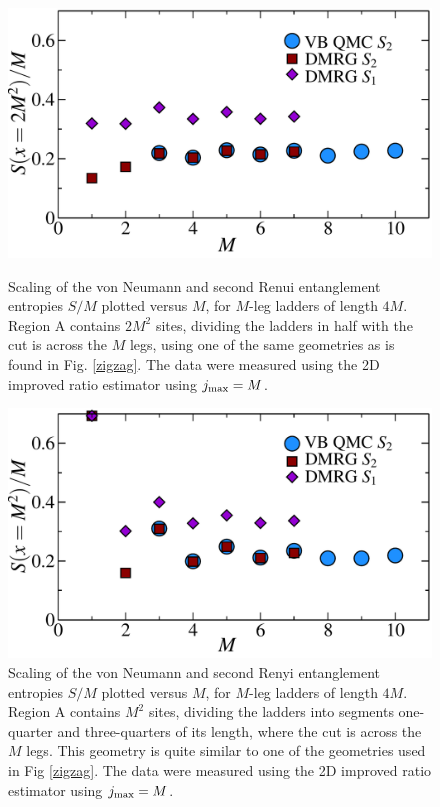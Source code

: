 \begin{figure} {
	\vspace{-1cm}
	\hspace{1cm}
	\includegraphics[width=5in]{./figures/made/awesomeplot/marea2.pdf} 
	\caption[Entanglement entropy $S/M$ vs. $M$ for $M$-leg ladders of length $4M$ cut in half]{ 
Scaling of the von Neumann and second Renui entanglement entropies $S/M$ plotted versus $M$, for $M$-leg ladders of length $4M$.  
Region A contains $2M^2$ sites, dividing the ladders in half with the cut is across the $M$ legs, using one of the same geometries as is found in Fig. \ref{zigzag}.
The data were measured using the 2D improved ratio estimator using $j_{\rm max} = M$.
	\label{2Dbetter1}
	}
\vspace{1cm}
\hspace{1cm}
	\includegraphics[width=5in]{./figures/made/awesomeplot/marea.pdf} 
	\caption[Entanglement entropy $S/M$ vs. $M$ for $M$-leg ladders of length $4M$ with a different cut]{ 
	Scaling of the von Neumann and second Renyi entanglement entropies $S/M$ plotted versus $M$, for $M$-leg ladders of length $4M$.  
Region A contains $M^2$ sites, dividing the ladders into segments one-quarter and three-quarters of its length, where the cut is across the $M$ legs.  This geometry is quite similar to one of the geometries used in Fig \ref{zigzag}.
The data were measured using the 2D improved ratio estimator using $j_{\rm max} = M$.
		\label{2Dbetter2}
	}

} \end{figure}

